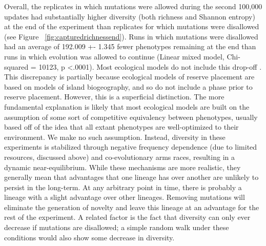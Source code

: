\documentclass[letterpaper]{article}
\begin{document}
Overall, the replicates in which mutations were allowed during the second 100,000 updates had substantially higher diversity (both richness and Shannon entropy) at the end of the experiment than replicates for which mutations were disallowed (see Figure ~\ref{fig:capturedrichnessend}). Runs in which mutations were disallowed had an average of 192.009 +- 1.345 fewer phenotypes remaining at the end than runs in which evolution was allowed to continue (Linear mixed model, Chi-squared = 10123, p \textless .0001). Most ecological models do not include this drop-off \citep{macarthur_theory_1967, kadmon_integrating_2007,tjorve_how_2010}. This discrepancy is partially because ecological models of reserve placement are based on models of island biogeography, and so do not include a phase prior to reserve placement. However, this is a superficial distinction. The more fundamental explanation is likely that most ecological models are built on the assumption of some sort of competitive equivalency between phenotypes, usually based off of the idea that all extant phenotypes are well-optimized to their environment. We make no such assumption. Instead, diversity in these experiments is stabilized through negative frequency dependence (due to limited resources, discussed above) and co-evolutionary arms races, resulting in a dynamic near-equilibrium. While these mechanisms are more realistic, they generally mean that advantages that one lineage has over another are unlikely to persist in the long-term. At any arbitrary point in time, there is probably a lineage with a slight advantage over other lineages. Removing mutations will eliminate the generation of novelty and leave this lineage at an advantage for the rest of the experiment. A related factor is the fact that diversity can only ever decrease if mutations are disallowed; a simple random walk under these conditions would also show some decrease in diversity.
%
%
%
%
%
%
\end{document}
